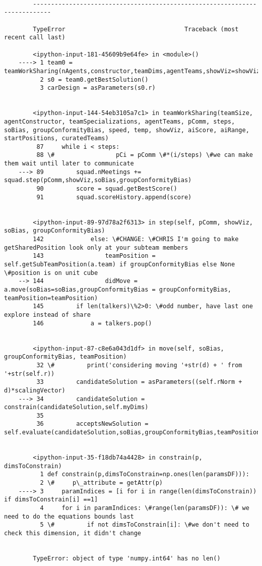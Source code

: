 \documentclass[11pt]{article}
\begin{document}
    \begin{Verbatim}[commandchars=\\\{\}]

        ---------------------------------------------------------------------------

        TypeError                                 Traceback (most recent call last)

        <ipython-input-181-45609b9e64fe> in <module>()
    ----> 1 team0 = teamWorkSharing(nAgents,constructor,teamDims,agentTeams,showViz=showViz,speed=None,pComm=pComm,steps=steps,groupConformityBias=True,soBias=True,aiScore=aiScore,aiRange=aiRange)
          2 s0 = team0.getBestSolution()
          3 carDesign = asParameters(s0.r)


        <ipython-input-144-54eb3105a7c1> in teamWorkSharing(teamSize, agentConstructor, teamSpecializations, agentTeams, pComm, steps, soBias, groupConformityBias, speed, temp, showViz, aiScore, aiRange, startPositions, curatedTeams)
         87     while i < steps:
         88 \#                 pCi = pComm \#*(i/steps) \#we can make them wait until later to communicate
    ---> 89         squad.nMeetings += squad.step(pComm,showViz,soBias,groupConformityBias)
         90         score = squad.getBestScore()
         91         squad.scoreHistory.append(score)


        <ipython-input-89-97d78a2f6313> in step(self, pComm, showViz, soBias, groupConformityBias)
        142             else: \#CHANGE: \#CHRIS I'm going to make getSharedPosition look only at your subteam members
        143                 teamPosition = self.getSubTeamPosition(a.team) if groupConformityBias else None \#position is on unit cube
    --> 144                 didMove = a.move(soBias=soBias,groupConformityBias = groupConformityBias, teamPosition=teamPosition)
        145         if len(talkers)\%2>0: \#odd number, have last one explore instead of share
        146             a = talkers.pop()


        <ipython-input-87-c8e6a043d1df> in move(self, soBias, groupConformityBias, teamPosition)
         32 \#         print('considering moving '+str(d) + ' from '+str(self.r))
         33         candidateSolution = asParameters((self.rNorm + d)*scalingVector)
    ---> 34         candidateSolution = constrain(candidateSolution,self.myDims)
         35 
         36         acceptsNewSolution = self.evaluate(candidateSolution,soBias,groupConformityBias,teamPosition=teamPosition)


        <ipython-input-35-f18db74a4428> in constrain(p, dimsToConstrain)
          1 def constrain(p,dimsToConstrain=np.ones(len(paramsDF))):
          2 \#     p\_attribute = getAttr(p)
    ----> 3     paramIndices = [i for i in range(len(dimsToConstrain)) if dimsToConstrain[i] ==1]
          4     for i in paramIndices: \#range(len(paramsDF)): \# we need to do the equations bounds last
          5 \#         if not dimsToConstrain[i]: \#we don't need to check this dimension, it didn't change


        TypeError: object of type 'numpy.int64' has no len()

    \end{Verbatim}
\end{document}
